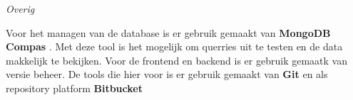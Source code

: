 \whitespace[2]
\textit{Overig}

\whitespace[2]
Voor het managen van de database is er gebruik gemaakt van \textbf{MongoDB Compas} \parencite{MongoDBCompas}.
Met deze tool is het mogelijk om querries uit te testen en de data makkelijk te bekijken.
Voor de frontend en backend is er gebruik gemaatk van versie beheer.
De tools die hier voor is er gebruik gemaakt van \textbf{Git} \parencite{Git} en als repository platform \textbf{Bitbucket} \parencite{BitBucket}

